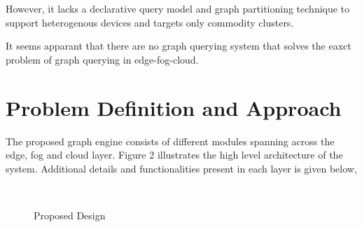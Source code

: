 \documentclass[conference]{IEEEtran}
\begin{document}
However, it lacks a declarative query model and graph partitioning technique to support heterogenous devices and targets only commodity clusters.

It seems apparant that there are no graph querying system that solves the eaxct problem of graph querying in edge-fog-cloud. 

\section{Problem Definition and Approach}

The proposed graph engine consists of different modules spanning across the edge, fog and cloud layer. Figure 2 illustrates the high level architecture of the system. Additional details and functionalities present in each layer is given below,

\begin{figure}[th]
	\centering%
	\qquad
	\\
	\label{fig:problem-approach}
	\caption{Proposed Design}
	\vspace{-0.1in}
\end{figure} 
\end{document}
